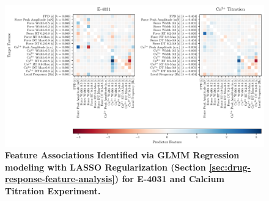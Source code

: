 \documentclass{report}
\begin{document}
     \begin{figure}
        \centering
        \includegraphics[width=1\textwidth, keepaspectratio]{plots/chapter_8/coefficient_heatmap_pair_supplementary.pdf}
        \caption[Feature Associations Identified via Generalized Linear Mixed Model with LASSO Regularization (E-4031 and Calcium Titration)]{\textbf{Feature Associations Identified via GLMM Regression modeling with LASSO Regularization (Section \ref{sec:drug-response-feature-analysis}) for E-4031 and Calcium Titration Experiment.}}
        \label{fig:regression-sup}
    \end{figure}



    
\end{document}
